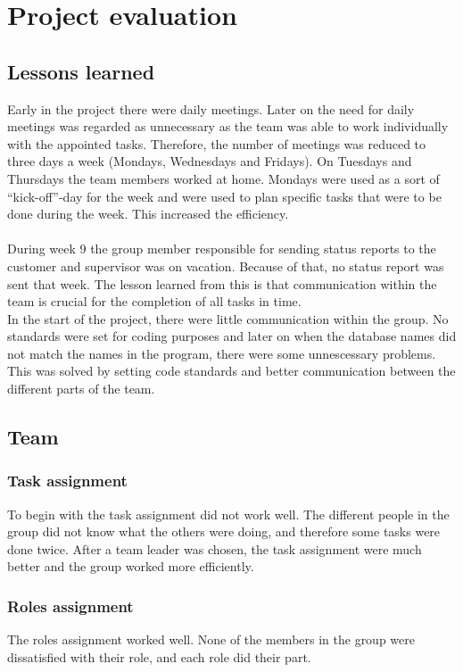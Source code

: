 \chapter{Project evaluation}

\section{Lessons learned}

Early in the project there were daily meetings. Later on the need for daily meetings was regarded as unnecessary as the team was able to work individually with the appointed tasks. Therefore, the number of meetings was reduced to three days a week (Mondays, Wednesdays and Fridays). On Tuesdays and Thursdays the team members worked at home. Mondays were used as a sort of “kick-off”-day for the week and were used to plan specific tasks that were to be done during the week. This increased the efficiency.\\
\\
During week 9 the group member responsible for sending status reports to the customer and supervisor was on vacation. Because of that, no status report was sent that week. The lesson learned from this is that communication within the team is crucial for the completion of all tasks in time.
\\
In the start of the project, there were little communication within the group. No standards were set
for coding purposes and later on when the database names did not match the names in the program, there were some unnescessary
problems. This was solved by setting code standards and better communication between the different 
parts of the team. 

\section{Team}

\subsection*{Task assignment}
To begin with the task assignment did not work well. The different people in 
the group did not know what the others were doing, and therefore some tasks were done twice.
After a team leader was chosen, the task assignment were much better and the group worked more efficiently. 

\subsection*{Roles assignment}
The roles assignment worked well. None of the members in the group were dissatisfied with their role, and each role
did their part.
